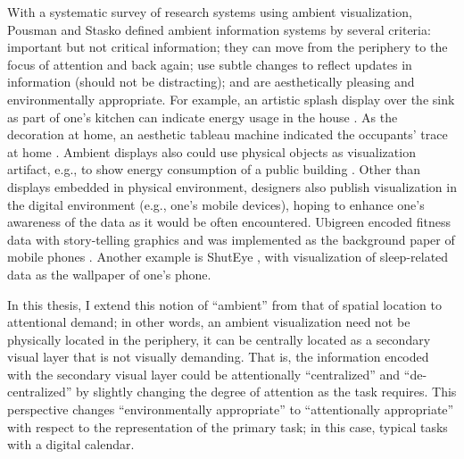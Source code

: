 \documentclass[12pt,oneside]{book}
\begin{document}
With a systematic survey of research systems using ambient visualization, Pousman and Stasko\cite{pousman_taxonomy_2006} defined ambient information systems by several criteria: important but not critical information; they can move from the periphery to the focus of attention and back again; use subtle changes to reflect updates in information (should not be distracting); and are aesthetically pleasing and environmentally appropriate. 
For example, an artistic splash display over the sink as part of one's kitchen can indicate energy usage in the house \cite{bartram_smart_2011}.  As the decoration at home, an aesthetic tableau machine indicated the occupants' trace at home \cite{pousman_living_2008}.  Ambient displays also could use physical objects as visualization artifact, e.g., to show energy consumption of a public building \cite{hazlewood_issues_2011}.  Other than displays embedded in physical environment, designers also publish visualization in the digital environment (e.g., one's mobile devices), hoping to enhance one's awareness of the data as it would be often encountered.  Ubigreen encoded fitness data with story-telling graphics and was implemented as the background paper of mobile phones \cite{froehlich_ubigreen:_2009}.  Another example is ShutEye \cite{bauer_shuteye:_2012}, with visualization of sleep-related data as the wallpaper of one's phone.


In this thesis, I extend this notion of ``ambient'' from that of spatial location to attentional demand; in other words, an ambient visualization need not be physically located in the periphery, it can be centrally located as a secondary visual layer that is not visually demanding.  That is, the information encoded with the secondary visual layer could be attentionally ``centralized'' and ``de-centralized'' by slightly changing the degree of attention as the task requires.  This perspective changes ``environmentally appropriate'' to ``attentionally appropriate'' with respect to the representation of the primary task; in this case, typical tasks with a digital calendar.
\end{document}
